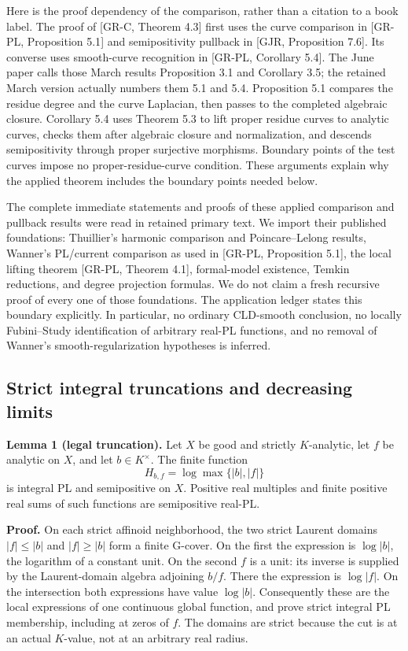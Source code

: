 \documentclass[
  11pt,
]{article}
\begin{document}
Here is the proof dependency of the comparison, rather than a citation
to a book label. The proof of {[}GR-C, Theorem 4.3{]} first uses the
curve comparison in {[}GR-PL, Proposition 5.1{]} and semipositivity
pullback in {[}GJR, Proposition 7.6{]}. Its converse uses smooth-curve
recognition in {[}GR-PL, Corollary 5.4{]}. The June paper calls those
March results Proposition 3.1 and Corollary 3.5; the retained March
version actually numbers them 5.1 and 5.4. Proposition 5.1 compares the
residue degree and the curve Laplacian, then passes to the completed
algebraic closure. Corollary 5.4 uses Theorem 5.3 to lift proper residue
curves to analytic curves, checks them after algebraic closure and
normalization, and descends semipositivity through proper surjective
morphisms. Boundary points of the test curves impose no
proper-residue-curve condition. These arguments explain why the applied
theorem includes the boundary points needed below.

The complete immediate statements and proofs of these applied comparison
and pullback results were read in retained primary text. We import their
published foundations: Thuillier's harmonic comparison and
Poincare--Lelong results, Wanner's PL/current comparison as used in
{[}GR-PL, Proposition 5.1{]}, the local lifting theorem {[}GR-PL,
Theorem 4.1{]}, formal-model existence, Temkin reductions, and degree
projection formulas. We do not claim a fresh recursive proof of every
one of those foundations. The application ledger states this boundary
explicitly. In particular, no ordinary CLD-smooth conclusion, no locally
Fubini--Study identification of arbitrary real-PL functions, and no
removal of Wanner's smooth-regularization hypotheses is inferred.

\subsection{Strict integral truncations and decreasing
limits}\label{strict-integral-truncations-and-decreasing-limits}

\textbf{Lemma 1 (legal truncation).} Let \(X\) be good and strictly
\(K\)-analytic, let \(f\) be analytic on \(X\), and let
\(b\in K^\times\). The finite function \[H_{b,f}=\log\max\{|b|,|f|\}\]
is integral PL and semipositive on \(X\). Positive real multiples and
finite positive real sums of such functions are semipositive real-PL.

\textbf{Proof.} On each strict affinoid neighborhood, the two strict
Laurent domains \(|f|\le |b|\) and \(|f|\ge |b|\) form a finite G-cover.
On the first the expression is \(\log|b|\), the logarithm of a constant
unit. On the second \(f\) is a unit: its inverse is supplied by the
Laurent-domain algebra adjoining \(b/f\). There the expression is
\(\log|f|\). On the intersection both expressions have value
\(\log|b|\). Consequently these are the local expressions of one
continuous global function, and prove strict integral PL membership,
including at zeros of \(f\). The domains are strict because the cut is
at an actual \(K\)-value, not at an arbitrary real radius.
\end{document}
